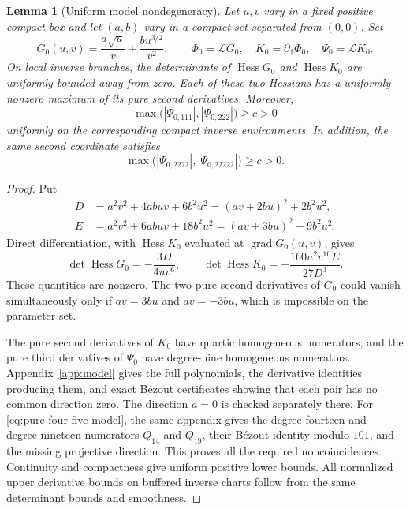 \documentclass[11pt,a4paper]{article}
\numberwithin{equation}{section}
\newtheorem{lemma}[theorem]{Lemma}
\theoremstyle{remark}
\DeclareMathOperator{\Hess}{Hess}
\DeclareMathOperator{\grad}{grad}
\newcommand{\Leg}{\mathcal L}
\begin{document}
\begin{lemma}[Uniform model nondegeneracy]\label{lem:model}
Let $u,v$ vary in a fixed positive compact box and let $(a,b)$ vary in a
compact set separated from $(0,0)$. Set
\begin{equation}\label{eq:G0}
 G_0(u,v)=\frac{a\sqrt u}{v}+\frac{bu^{3/2}}{v^2},
 \qquad \Phi_0=\Leg G_0,\quad K_0=\partial_1\Phi_0,
 \quad \Psi_0=\Leg K_0.
\end{equation}
On local inverse branches, the determinants of $\Hess G_0$ and $\Hess K_0$
are uniformly bounded away from zero. Each of these two Hessians has a
uniformly nonzero maximum of its pure second derivatives. Moreover,
\begin{equation}\label{eq:pure-third-max}
 \max\bigl(|\Psi_{0,111}|,|\Psi_{0,222}|\bigr)\ge c>0
\end{equation}
uniformly on the corresponding compact inverse environments. In addition,
the same second coordinate satisfies
\begin{equation}\label{eq:pure-four-five-model}
 \max\bigl(|\Psi_{0,2222}|,|\Psi_{0,22222}|\bigr)\ge c>0.
\end{equation}
\end{lemma}
\begin{proof}
Put
\begin{align*}
 D&=a^2v^2+4abuv+6b^2u^2=(av+2bu)^2+2b^2u^2,\\
 E&=a^2v^2+6abuv+18b^2u^2=(av+3bu)^2+9b^2u^2.
\end{align*}
Direct differentiation, with $\Hess K_0$ evaluated at $\grad G_0(u,v)$,
gives
\begin{equation}\label{eq:model-dets}
 \det\Hess G_0=-\frac{3D}{4uv^6},\qquad
 \det\Hess K_0=-\frac{160u^2v^{10}E}{27D^3}.
\end{equation}
These quantities are nonzero. The two pure second derivatives of $G_0$
could vanish simultaneously only if $av=3bu$ and $av=-3bu$, which is
impossible on the parameter set.

The pure second derivatives of $K_0$ have quartic homogeneous numerators,
and the pure third derivatives of $\Psi_0$ have degree-nine homogeneous
numerators. Appendix~\ref{app:model} gives the full polynomials, the
derivative identities producing them, and exact B\'ezout certificates
showing that each pair has no common direction zero. The direction $a=0$
is checked separately there. For \eqref{eq:pure-four-five-model},
the same appendix gives the degree-fourteen and degree-nineteen numerators
$Q_{14}$ and $Q_{19}$, their B\'ezout identity modulo $101$, and the
missing projective direction. This proves all the required noncoincidences.
Continuity and compactness give uniform positive lower bounds. All
normalized upper derivative bounds on buffered inverse charts follow
from the same determinant bounds and smoothness.
\end{proof}
\end{document}
